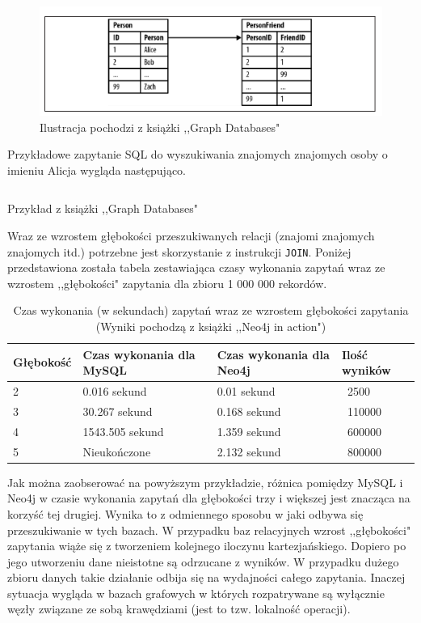 \documentclass[brudnopis]{xmgr}
\begin{document}
\begin{figure}[H]
	\includegraphics[scale=0.75]{images/relational-schema-friends.png}
	\caption{Ilustracja pochodzi z książki ,,Graph Databases"\cite{Robinson:2013:GD}}
\end{figure}

Przykładowe zapytanie SQL do wyszukiwania znajomych znajomych osoby o imieniu Alicja wygląda następująco.

\begin{listing}[H]
	\inputminted{sql}{listings/sql/relational-schema-friends-fof-query.sql}
	\caption{Przykład z książki ,,Graph Databases"\cite{Robinson:2013:GD}}
\end{listing}

Wraz ze wzrostem głębokości przeszukiwanych relacji (znajomi znajomych znajomych itd.) potrzebne jest skorzystanie z instrukcji \texttt{JOIN}. Poniżej przedstawiona została tabela zestawiająca czasy wykonania zapytań wraz ze wzrostem ,,głębokości" zapytania dla zbioru 1 000 000 rekordów.

\begin{table}[H]
    \begin{tabular}{|l|l|l|l|}
      \hline 
      \textbf{Głębokość} & \textbf{Czas wykonania dla MySQL} & \textbf{Czas wykonania dla Neo4j} & \textbf{Ilość wyników} \\
      \hline
      2 & 0.016 sekund & 0.01 sekund & {~}2500 \\
      3 & 30.267 sekund & 0.168 sekund & {~}110000 \\
      4 & 1543.505 sekund & 1.359 sekund & {~}600000 \\
      5 & Nieukończone & 2.132 sekund & {~}800000 \\
      \hline
   \end{tabular} 
    \caption{Czas wykonania (w sekundach) zapytań wraz ze wzrostem głębokości zapytania (Wyniki pochodzą z książki ,,Neo4j in action"\cite{neo4jinaction})}
    \label{fig:mysqlvsneo4j_results}
\end{table}

Jak można zaobserować na powyższym przykładzie, różnica pomiędzy MySQL i Neo4j w czasie wykonania zapytań dla głębokości trzy i większej jest znacząca na korzyść tej drugiej. Wynika to z odmiennego sposobu w jaki odbywa się przeszukiwanie w tych bazach. W przypadku baz relacyjnych wzrost ,,głębokości" zapytania wiąże się z tworzeniem kolejnego iloczynu kartezjańskiego. Dopiero po jego utworzeniu dane nieistotne są odrzucane z wyników. W przypadku dużego zbioru danych takie działanie odbija się na wydajności całego zapytania. Inaczej sytuacja wygląda w bazach grafowych w których rozpatrywane są wyłącznie węzły związane ze sobą krawędziami (jest to tzw. lokalność operacji).
\end{document}
